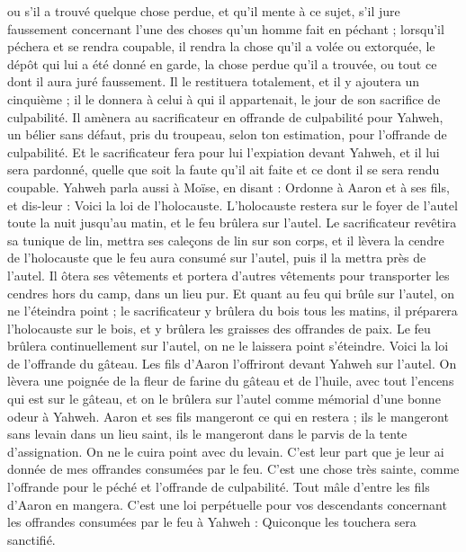 \begin{multicols}{2}
ou s'il a trouvé quelque chose perdue, et qu'il mente à ce sujet, s'il jure faussement concernant l’une des choses qu'un homme fait en péchant ;
lorsqu’il péchera et se rendra coupable, il rendra la chose qu'il a volée ou extorquée, le dépôt qui lui a été donné en garde, la chose perdue qu'il a trouvée,
ou tout ce dont il aura juré faussement. Il le restituera totalement, et il y ajoutera un cinquième ; il le donnera à celui à qui il appartenait, le jour de son sacrifice de culpabilité.
Il amènera au sacrificateur en offrande de culpabilité pour Yahweh, un bélier sans défaut, pris du troupeau, selon ton estimation, pour l’offrande de culpabilité.
Et le sacrificateur fera pour lui l’expiation devant Yahweh, et il lui sera pardonné, quelle que soit la faute qu’il ait faite et ce dont il se sera rendu coupable.
\VerseOne{}Yahweh parla aussi à Moïse, en disant :
Ordonne à Aaron et à ses fils, et dis-leur : Voici la loi de l'holocauste. L'holocauste restera sur le foyer de l'autel toute la nuit jusqu'au matin, et le feu brûlera sur l'autel.
Le sacrificateur revêtira sa tunique de lin, mettra ses caleçons de lin sur son corps, et il lèvera la cendre de l’holocauste que le feu aura consumé sur l'autel, puis il la mettra près de l'autel.
Il ôtera ses vêtements et portera d'autres vêtements pour transporter les cendres hors du camp, dans un lieu pur.
Et quant au feu qui brûle sur l'autel, on ne l'éteindra point ; le sacrificateur y brûlera du bois tous les matins, il préparera l'holocauste sur le bois, et y brûlera les graisses des offrandes de paix.
Le feu brûlera continuellement sur l'autel, on ne le laissera point s’éteindre.
Voici la loi de l'offrande du gâteau. Les fils d'Aaron l'offriront devant Yahweh sur l'autel.
On lèvera une poignée de la fleur de farine du gâteau et de l’huile, avec tout l'encens qui est sur le gâteau, et on le brûlera sur l'autel comme mémorial d’une bonne odeur à Yahweh.
Aaron et ses fils mangeront ce qui en restera ; ils le mangeront sans levain dans un lieu saint, ils le mangeront dans le parvis de la tente d'assignation.
On ne le cuira point avec du levain. C’est leur part que je leur ai donnée de mes offrandes consumées par le feu. C'est une chose très sainte, comme l’offrande pour le péché et l’offrande de culpabilité.
Tout mâle d'entre les fils d'Aaron en mangera. C'est une loi perpétuelle pour vos descendants concernant les offrandes consumées par le feu à Yahweh : Quiconque les touchera sera sanctifié.

\end{multicols}
